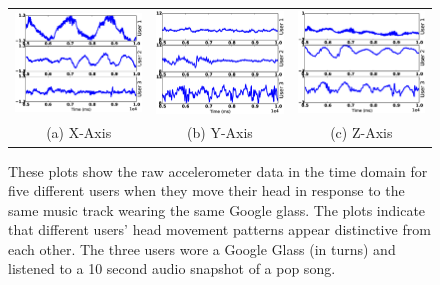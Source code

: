 \begin{figure}[t]
\begin{center}
\begin{tabular}{ccc}
\includegraphics [width=.33\linewidth]{figure/raw_x.eps}&
\includegraphics [width=.33\linewidth]{figure/raw_y.eps}&
\includegraphics [width=.33\linewidth]{figure/raw_z.eps}\\
(a) X-Axis & (b) Y-Axis & (c) Z-Axis \\
\end{tabular}

\end{center}
\caption{\label{fig:raw} These plots show the raw accelerometer data in the
time domain for five different users when they move their head in response to
the same music track wearing the same Google glass. The plots
indicate that different users' head movement patterns appear distinctive from
each other. The three users wore a Google Glass (in turns) and listened to a
10 second audio snapshot of a pop song.}
\vspace{-2pt}
\end{figure} 